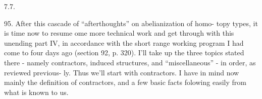 7.7. 

95. After this cascade of ``afterthoughts'' on abelianization of homo-%
topy types, it is time now to resume ome more technical work\hand{,} and get
through with this unending part IV, in accordance with the short range
working program I had come to four days ago (section 92, p. 320). I'll
take up the three topics stated there - namely contractors, induced
structures, and ``miscellaneous'' - in  order, as reviewed previous-%
ly. Thus we'll start with contractors. I have in mind now mainly the
definition of contractors, and a few basic facts folowing easily from
what is  known to us.


